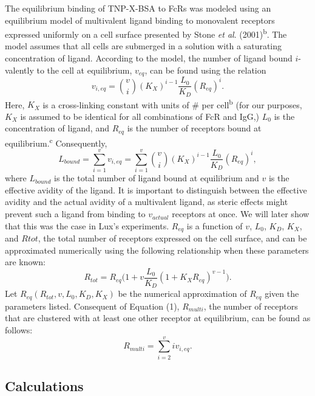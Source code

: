 The equilibrium binding of TNP-X-BSA to Fc\textgamma{}Rs was modeled using an equilibrium model of multivalent ligand binding to monovalent receptors expressed uniformly on a cell surface presented by Stone \textit{et al}. (2001)\textsuperscript{b}. The model assumes that all cells are submerged in a solution with a saturating concentration of ligand. 
According to the model, the number of ligand bound $i$-valently to the cell at equilibrium, $v_{eq}$, can be found using the relation
\begin{equation}
v_{i,eq} = {v\choose i} (K_X)^{i-1} \frac{L_0}{K_D} (R_{eq})^i.
\end{equation}
Here, $K_X$ is a cross-linking constant with units of \# per cell\textsuperscript{b} (for our purposes, $K_X$ is assumed to be identical for all combinations of Fc\textgamma{}R and IgG,) $L_0$ is the concentration of ligand, and $R_{eq}$ is the number of receptors bound at equilibrium.\textsuperscript{c} Consequently,
\begin{equation}
L_{bound} = \sum_{i=1}^{v} v_{i,eq} = \sum_{i=1}^{v} {v\choose i} (K_X)^{i-1} \frac{L_0}{K_D} (R_{eq})^i,
\end{equation}
where $L_{bound}$ is the total number of ligand bound at equilibrium and $v$ is the effective avidity of the ligand. It is important to distinguish between the effective avidity and the actual avidity of a multivalent ligand, as steric effects might prevent such a ligand from binding to $v_{actual}$ receptors at once. We will later show that this was the case in Lux's experiments. $R_{eq}$ is a function of $v$, $L_0$, $K_D$, $K_X$, and $Rtot$, the total number of receptors expressed on the cell surface, and can be approximated numerically using the following relationship when these parameters are known:
\begin{equation}
R_{tot} = R_{eq} \Big(1+v \frac{L_0}{K_D} (1+K_X R_{eq})^{v-1}\Big).
\end{equation}
Let $R_{eq}(R_{tot},v,L_0,K_D,K_X)$ be the numerical approximation of $R_{eq}$ given the parameters listed. Consequent of Equation (1), $R_{multi}$, the number of receptors that are clustered with at least one other receptor at equilibrium, can be found as follows:
\begin{equation}
R_{multi} = \sum_{i=2}^{v} iv_{i,eq}.
\end{equation}


\subsection{Calculations}


